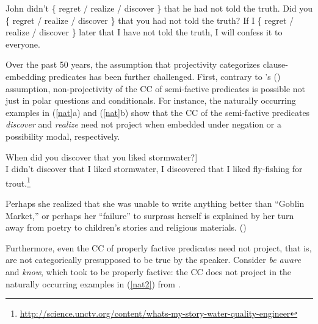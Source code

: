 \documentclass[11pt,fleqn]{article}
\newcommand{\6}{\mbox{$[\hspace*{-.6mm}[$}}
\newcommand{\9}{\mbox{$]\hspace*{-.6mm}]$}}
\newcommand{\citetpos}[1]{\citeauthor{#1}'s (\citeyear{#1})}
\begin{document}
\begin{exe}
\ex\label{kart2} \citealt[63f.]{karttunen71b}
\begin{xlist}
\ex John didn't \{ regret / realize / discover \} that he had not told the truth.
\ex  Did you \{ regret / realize / discover \} that you had not told the truth?
\ex  If I \{ regret / realize / discover \} later that I have not told the truth, I will confess it to everyone.
\end{xlist}
\end{exe}

Over the past 50 years, the assumption that projectivity categorizes clause-embedding predicates has been further challenged. First, contrary to \citetpos{karttunen71b} assumption, non-projectivity of the CC of semi-factive predicates is possible not just in polar questions and conditionals. For instance, the naturally occurring examples in (\ref{nat}a) and (\ref{nat}b) show that the CC of the semi-factive predicates {\em discover} and {\em realize} need not project when embedded under negation or a possibility modal, respectively.

\begin{exe}
\ex\label{nat} 
\begin{xlist}

\ex {[}When did you discover that you liked stormwater?] \\ I didn't discover that I liked stormwater, I discovered that I liked fly-fishing for trout.\footnote{\url{http://science.unctv.org/content/whats-my-story-water-quality-engineer}}

\ex Perhaps she realized that she was unable to write anything better than ``Goblin Market,'' or perhaps her ``failure'' to surprass herself is explained by her turn away from poetry to children's stories and religious materials. \hfill (\citealt[87]{beaver-belly})

\end{xlist}

\end{exe}
Furthermore, even the CC of properly factive predicates need not project, that is, are not categorically presupposed to be true by the speaker. Consider {\em be aware} and {\em know}, which \citet{karttunen71b} took to be properly factive: the CC does not project in the naturally occurring examples in (\ref{nat2}) from \citealt{beaver-belly}.
\end{document}
